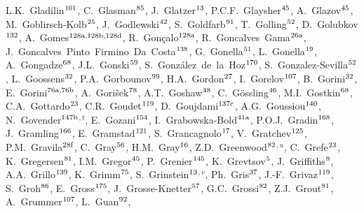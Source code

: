 \begin{flushleft}
L.K.~Gladilin$^\textrm{\scriptsize 101}$,
C.~Glasman$^\textrm{\scriptsize 85}$,
J.~Glatzer$^\textrm{\scriptsize 13}$,
P.C.F.~Glaysher$^\textrm{\scriptsize 45}$,
A.~Glazov$^\textrm{\scriptsize 45}$,
M.~Goblirsch-Kolb$^\textrm{\scriptsize 25}$,
J.~Godlewski$^\textrm{\scriptsize 42}$,
S.~Goldfarb$^\textrm{\scriptsize 91}$,
T.~Golling$^\textrm{\scriptsize 52}$,
D.~Golubkov$^\textrm{\scriptsize 132}$,
A.~Gomes$^\textrm{\scriptsize 128a,128b,128d}$,
R.~Gon\c{c}alo$^\textrm{\scriptsize 128a}$,
R.~Goncalves~Gama$^\textrm{\scriptsize 26a}$,
J.~Goncalves~Pinto~Firmino~Da~Costa$^\textrm{\scriptsize 138}$,
G.~Gonella$^\textrm{\scriptsize 51}$,
L.~Gonella$^\textrm{\scriptsize 19}$,
A.~Gongadze$^\textrm{\scriptsize 68}$,
J.L.~Gonski$^\textrm{\scriptsize 59}$,
S.~Gonz\'alez~de~la~Hoz$^\textrm{\scriptsize 170}$,
S.~Gonzalez-Sevilla$^\textrm{\scriptsize 52}$,
L.~Goossens$^\textrm{\scriptsize 32}$,
P.A.~Gorbounov$^\textrm{\scriptsize 99}$,
H.A.~Gordon$^\textrm{\scriptsize 27}$,
I.~Gorelov$^\textrm{\scriptsize 107}$,
B.~Gorini$^\textrm{\scriptsize 32}$,
E.~Gorini$^\textrm{\scriptsize 76a,76b}$,
A.~Gori\v{s}ek$^\textrm{\scriptsize 78}$,
A.T.~Goshaw$^\textrm{\scriptsize 48}$,
C.~G\"ossling$^\textrm{\scriptsize 46}$,
M.I.~Gostkin$^\textrm{\scriptsize 68}$,
C.A.~Gottardo$^\textrm{\scriptsize 23}$,
C.R.~Goudet$^\textrm{\scriptsize 119}$,
D.~Goujdami$^\textrm{\scriptsize 137c}$,
A.G.~Goussiou$^\textrm{\scriptsize 140}$,
N.~Govender$^\textrm{\scriptsize 147b}$$^{,t}$,
E.~Gozani$^\textrm{\scriptsize 154}$,
I.~Grabowska-Bold$^\textrm{\scriptsize 41a}$,
P.O.J.~Gradin$^\textrm{\scriptsize 168}$,
J.~Gramling$^\textrm{\scriptsize 166}$,
E.~Gramstad$^\textrm{\scriptsize 121}$,
S.~Grancagnolo$^\textrm{\scriptsize 17}$,
V.~Gratchev$^\textrm{\scriptsize 125}$,
P.M.~Gravila$^\textrm{\scriptsize 28f}$,
C.~Gray$^\textrm{\scriptsize 56}$,
H.M.~Gray$^\textrm{\scriptsize 16}$,
Z.D.~Greenwood$^\textrm{\scriptsize 82}$$^{,u}$,
C.~Grefe$^\textrm{\scriptsize 23}$,
K.~Gregersen$^\textrm{\scriptsize 81}$,
I.M.~Gregor$^\textrm{\scriptsize 45}$,
P.~Grenier$^\textrm{\scriptsize 145}$,
K.~Grevtsov$^\textrm{\scriptsize 5}$,
J.~Griffiths$^\textrm{\scriptsize 8}$,
A.A.~Grillo$^\textrm{\scriptsize 139}$,
K.~Grimm$^\textrm{\scriptsize 75}$,
S.~Grinstein$^\textrm{\scriptsize 13}$$^{,v}$,
Ph.~Gris$^\textrm{\scriptsize 37}$,
J.-F.~Grivaz$^\textrm{\scriptsize 119}$,
S.~Groh$^\textrm{\scriptsize 86}$,
E.~Gross$^\textrm{\scriptsize 175}$,
J.~Grosse-Knetter$^\textrm{\scriptsize 57}$,
G.C.~Grossi$^\textrm{\scriptsize 82}$,
Z.J.~Grout$^\textrm{\scriptsize 81}$,
A.~Grummer$^\textrm{\scriptsize 107}$,
L.~Guan$^\textrm{\scriptsize 92}$,
$$
\end{flushleft}
